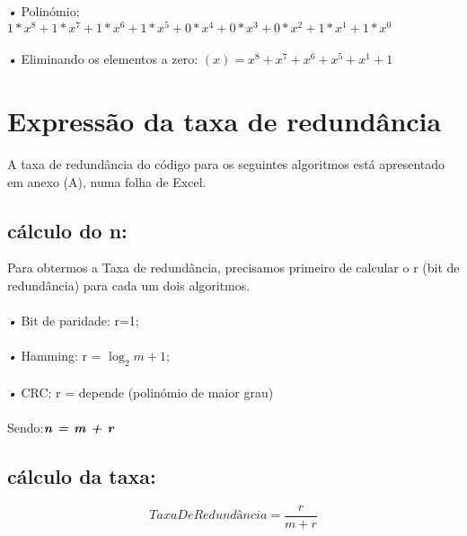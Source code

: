 \documentclass[13pt,a4paper]{report}
\begin{document}
\emph{•} Polinómio: 
$1*x^8+1*x^7+1*x^6+1*x^5+0*x^4+0*x^3+0*x^2+1*x^1+1*x^0$
	
\paragraph{}
\emph{•} Eliminando os elementos a zero:
$(x)=x^8+x^7+x^6+x^5+x^1+1$
    

\paragraph{}    
\section{Expressão da taxa de redundância}  
A taxa de redundância do código para os seguintes algoritmos está apresentado em anexo (A), numa folha de Excel.  
\subsection{cálculo do n:}
	Para obtermos a Taxa de redundância, precisamos primeiro de calcular o r (bit de redundância) para cada um dois algoritmos.
	
\paragraph{}
\emph{•} Bit de paridade: r=1;
	 
\paragraph{}
\emph{•} Hamming:	r = $\log_2 m + 1$; 
	 
\paragraph{}
\emph{•} CRC: r = depende (polinómio de maior grau)\paragraph{}
\rightarrow Sendo:${ \textbf{\textit{n = m + r} }}$ 
	


\subsection{cálculo da taxa:}
\begin{equation}
TaxaDeRedundância =\frac{r}{m + r}
\end{equation}
\end{document}
